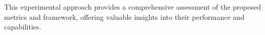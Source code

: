 

This experimental approach provides a comprehensive assessment of the proposed metrics and framework, offering valuable insights into their performance and capabilities.
